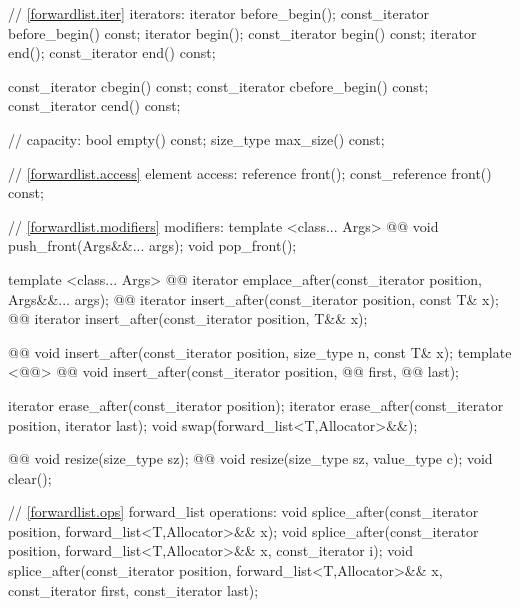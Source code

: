\documentclass[american,twoside]{book}
\begin{document}
\begin{codeblock}
{{    // \ref{forwardlist.iter} iterators:
    iterator before_begin();
    const_iterator before_begin() const;
    iterator begin(); 
    const_iterator begin() const; 
    iterator end(); 
    const_iterator end() const;

    const_iterator cbegin() const;
    const_iterator cbefore_begin() const;
    const_iterator cend() const;

    // capacity: 
    bool empty() const; 
    size_type max_size() const;

    // \ref{forwardlist.access} element access: 
    reference front(); 
    const_reference front() const; 

    // \ref{forwardlist.modifiers} modifiers: 
    template <class... Args> 
      @@ 
      void push_front(Args&&... args); 
    void pop_front();
   
    template <class... Args> 
      @@ 
      iterator emplace_after(const_iterator position, Args&&... args);
    @@ iterator insert_after(const_iterator position, const T& x);
    @@ iterator insert_after(const_iterator position, T&& x);

    @@ 
      void insert_after(const_iterator position, size_type n, const T& x); 
    template <@@> 
      @@
      void insert_after(const_iterator position, @@ first, @@ last);

    iterator erase_after(const_iterator position); 
    iterator erase_after(const_iterator position, iterator last); 
    void swap(forward_list<T,Allocator>&&);

    @@ void resize(size_type sz);
    @@ void resize(size_type sz, value_type c);
    void clear(); 

    // \ref{forwardlist.ops} forward_list operations: 
    void splice_after(const_iterator position, forward_list<T,Allocator>&& x); 
    void splice_after(const_iterator position, forward_list<T,Allocator>&& x,
                      const_iterator i); 
    void splice_after(const_iterator position, forward_list<T,Allocator>&& x,
                      const_iterator first, const_iterator last); 

}}
\end{codeblock}
\end{document}
